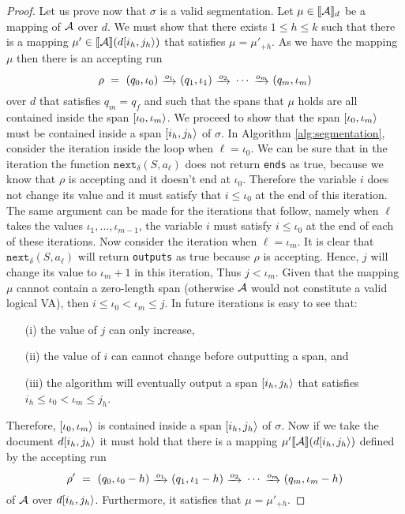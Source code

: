 \begin{proof}
    Let us prove now that $\sigma$ is a valid segmentation. Let $\mu \in
    \llbracket\mathcal{A}\rrbracket_d$ be a mapping of $\mathcal{A}$ over $d$. We must show that there exists
    $1 \leq h \leq k$ such that there is a mapping $\mu' \in
    \llbracket\mathcal{A}\rrbracket(d[i_h, j_h\rangle)$ that satisfies $\mu = \mu'_{+h}$. As we have
    the mapping $\mu$ then there is an accepting run 
    $$
    \rho \ = \ (q_0, \iota_0) \ \trans{o_1} \ (q_1, \iota_1) \ \trans{o_2} \ \cdots \ \trans{o_m} \ (q_m, \iota_m)
    $$ 
    over $d$ that satisfies $q_m = q_f$ and such that the spans that $\mu$ holds
    are all contained inside the span $[\iota_0, \iota_m\rangle$. We proceed to
    show that the span $[\iota_0, \iota_m\rangle$ must be contained inside a
    span $[i_h, j_h\rangle$ of $\sigma$. In Algorithm \ref{alg:segmentation},
    consider the iteration inside the loop when $\ell = \iota_0$. We can be sure
    that in the iteration the function $\texttt{next}_\delta(S, a_\ell)$ does
    not return \texttt{ends} as true, because we know that $\rho$ is accepting
    and it doesn't end at $\iota_0$. Therefore the variable $i$ does not change
    its value and it must satisfy that $i \leq \iota_0$ at the end of this
    iteration. The same argument can be made for the iterations that follow,
    namely when $\ell$ takes the values $\iota_1, \ldots, \iota_{m-1}$, the
    variable $i$ must satisfy $i \leq \iota_0$ at the end of each of these
    iterations. Now consider the iteration when $\ell = \iota_m$. It is clear
    that $\texttt{next}_\delta(S, a_\ell)$ will return \texttt{outputs} as true
    because $\rho$ is accepting. Hence, $j$ will change its value to $\iota_m +
    1$ in this iteration, Thus $j < \iota_m$. Given that the mapping $\mu$
    cannot contain a zero-length span (otherwise $\mathcal{A}$ would not constitute a
    valid logical VA), then $i \leq \iota_0 < \iota_m \leq j$. In future
    iterations is easy to see that:
    \begin{enumerate}
        \item[(i)] the value of $j$ can only increase,
        \item[(ii)] the value of $i$ can cannot change before outputting a span,
        and
        \item[(iii)] the algorithm will eventually output a span $[i_h,
        j_h\rangle$ that satisfies $i_h \leq \iota_0 < \iota_m \leq j_h$. 
    \end{enumerate}
    Therefore, $[\iota_0, \iota_m\rangle$ is contained inside a span
    $[i_h, j_h\rangle$ of $\sigma$. Now if we take the document $d[i_h,
    j_h\rangle$ it must hold that there is a mapping $\mu' \llbracket\mathcal{A}\rrbracket(d[i_h,
    j_h\rangle)$ defined by the accepting run 
    $$
    \rho' \ = \ (q_0, \iota_0-h) \ \trans{o_1} \ (q_1, \iota_1-h) \ \trans{o_2} \ \cdots \ \trans{o_m} \ (q_m, \iota_m-h)
    $$ 
    of $\mathcal{A}$ over $d[i_h, j_h\rangle$. Furthermore, it satisfies that $\mu =
    \mu'_{+h}$.


\end{proof}
